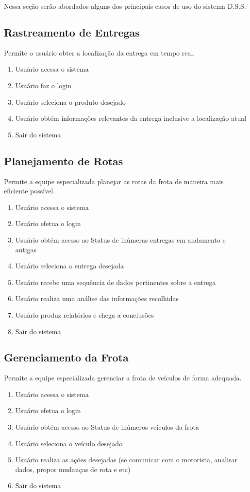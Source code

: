 Nessa seção serão abordados alguns dos principais casos de uso do sistema D.S.S.

\subsection{Rastreamento de Entregas}
Permite o usuário obter a localização da entrega em tempo real.
\begin{enumerate}
	\item Usuário acessa o sistema
	\item Usuário faz o login
	\item Usuário seleciona o produto desejado
	\item Usuário obtém informações relevantes da entrega inclusive a localização atual
	\item Sair do sistema
\end{enumerate}

\subsection{Planejamento de Rotas}
Permite a equipe especializada planejar as rotas da frota de maneira mais eficiente possível.

\begin{enumerate}
	\item Usuário acessa o sistema
	\item Usuário efetua o login
	\item Usuário obtém acesso ao Status de inúmeras entregas em andamento e antigas 
	\item Usuário seleciona a entrega desejada
	\item Usuário recebe uma sequência de dados pertinentes sobre a entrega
	\item Usuário realiza uma análise das informações recolhidas
	\item Usuário produz relatórios e chega a conclusões
	\item Sair do sistema
\end{enumerate}

\subsection{Gerenciamento da Frota}
Permite a equipe especializada gerenciar a frota de veículos de forma adequada.
\begin{enumerate}
	\item Usuário acessa o sistema
	\item Usuário efetua o login
	\item Usuário obtém acesso ao Status de inúmeros veículos da frota
	\item Usuário seleciona o veículo desejado
	\item Usuário realiza as ações desejadas (se comunicar com o motorista, analisar dados, propor mudanças de rota e etc)
	\item Sair do sistema
\end{enumerate}

